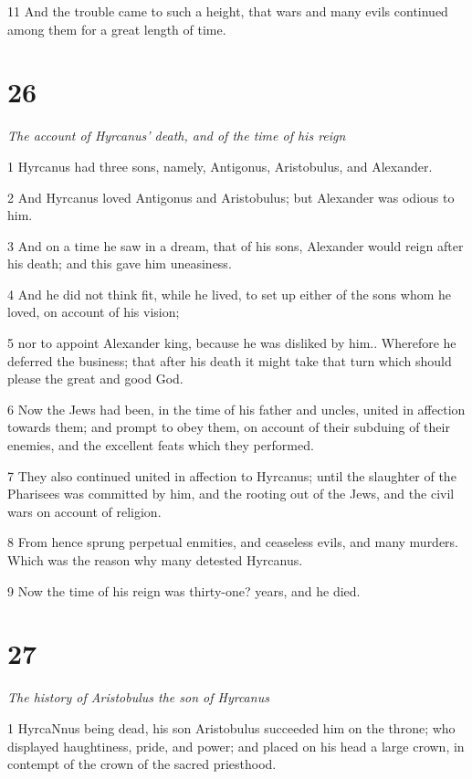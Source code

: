 11 And the trouble came to such a height, that wars and many evils continued among them for a great length of time. 

\chapter{26}

\par \textit{The account of Hyrcanus’ death, and of the time of his reign}

1 Hyrcanus had three sons, namely, Antigonus, Aristobulus, and Alexander. 

2 And Hyrcanus loved Antigonus and Aristobulus; but Alexander was odious to him. 

3 And on a time he saw in a dream, that of his sons, Alexander would reign after his death; and this gave him uneasiness. 

4 And he did not think fit, while he lived, to set up either of the sons whom he loved, on account of his vision; 

5 nor to appoint Alexander king, because he was disliked by him.. Wherefore he deferred the business; that after his death it might take that turn which should please the great and good God. 

6 Now the Jews had been, in the time of his father and uncles, united in affection towards them; and prompt to obey them, on account of their subduing of their enemies, and the excellent feats which they performed. 

7 They also continued united in affection to Hyrcanus; until the slaughter of the Pharisees was committed by him, and the rooting out of the Jews, and the civil wars on account of religion. 

8 From hence sprung perpetual enmities, and ceaseless evils, and many murders. Which was the reason why many detested Hyrcanus. 

9 Now the time of his reign was thirty-one? years, and he died. 

\chapter{27}

\par \textit{The history of Aristobulus the son of Hyrcanus}

1 HyrcaNnus being dead, his son Aristobulus succeeded him on the throne; who displayed haughtiness, pride, and power; and placed on his head a large crown, in contempt of the crown of the sacred priesthood. 

